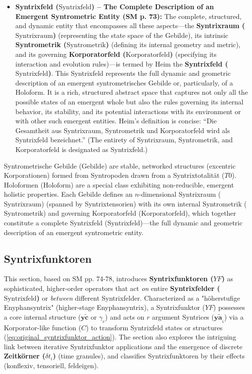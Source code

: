 \documentclass[12pt]{article}
\newcommand{\q}[1]{\enquote{#1}}
\newcommand{\syntrix}{\bm{y\widetilde{a}}}
\newcommand{\syntrixtotalitaet}{T0}
\newcommand{\syntrixfeld}{\text{Syntrixfeld}}
\newcommand{\syntrometrischesGebilde}{\text{Gebilde}}
\newcommand{\holoform}{\text{Holoform}}
\newcommand{\syntrixraum}{\text{Syntrixraum}}
\newcommand{\syntrometrik}{\text{Syntrometrik}}
\newcommand{\korporatorfeld}{\text{Korporatorfeld}}
\newcommand{\syntrixfunktor}{YF}
\newcommand{\zeitkorn}{\delta t_i}
\begin{document}
\begin{itemize}
    \item \textbf{Syntrixfeld (\(\syntrixfeld\)) – The Complete Description of an Emergent Syntrometric Entity (SM p. 73):}
    The complete, structured, and dynamic entity that encompasses all these aspects—the \textbf{Syntrixraum (\(\syntrixraum\))} (representing the state space of the Gebilde), its intrinsic \textbf{Syntrometrik (\(\syntrometrik\))} (defining its internal geometry and metric), and its governing \textbf{Korporatorfeld (\(\korporatorfeld\))} (specifying its interaction and evolution rules)—is termed by Heim the \textbf{Syntrixfeld (\(\syntrixfeld\))}. This Syntrixfeld represents the full dynamic and geometric description of an emergent syntrometrisches Gebilde or, particularly, of a Holoform. It is a rich, structured abstract space that captures not only all the possible states of an emergent whole but also the rules governing its internal behavior, its stability, and its potential interactions with its environment or with other such emergent entities. Heim's definition is concise: \q{Die Gesamtheit aus Syntrixraum, Syntrometrik und Korporatorfeld wird als Syntrixfeld bezeichnet.} (The entirety of Syntrixraum, Syntrometrik, and Korporatorfeld is designated as Syntrixfeld.)
\end{itemize}

Syntrometrische Gebilde (\(\syntrometrischesGebilde\)) are stable, networked structures (excentric Korporationen) formed from Syntropoden drawn from a Syntrixtotalität (\(\syntrixtotalitaet\)). Holoformen (\(\holoform\)) are a special class exhibiting non-reducible, emergent holistic properties. Each Gebilde defines an \(n\)-dimensional Syntrixraum (\(\syntrixraum\)) (spanned by Syntrixtensorien) with its own internal Syntrometrik (\(\syntrometrik\)) and governing Korporatorfeld (\(\korporatorfeld\)), which together constitute a complete Syntrixfeld (\(\syntrixfeld\))—the full dynamic and geometric description of an emergent syntrometric entity.

\subsection{Syntrixfunktoren}
\label{sec:syntrixfunktoren}

This section, based on SM pp. 74-78, introduces \textbf{Syntrixfunktoren (\(\syntrixfunktor\))} as sophisticated, higher-order operators that act \textit{on} entire \textbf{Syntrixfelder (\(\syntrixfeld\))} or \textit{between} different Syntrixfelder. Characterized as a "höherstufige Enyphansyntrix" (higher-stage Enyphansyntrix), a Syntrixfunktor (\(\syntrixfunktor\)) possesses a core internal structure (\(\mathbf{y\widetilde{c}}\) or \(\gamma_c\)) and acts on \(r\) argument Syntrices (\(\syntrix_\varsigma\)) via a Korporator-like function (\(C\)) to transform Syntrixfeld states or structures (\eqref{eq:original_syntrixfunktor_action}). The section also explores the intriguing link between iterative Syntrixfunktor applications and the emergence of discrete \textbf{Zeitkörner (\(\zeitkorn\))} (time granules), and classifies Syntrixfunktoren by their effects (konflexiv, tensoriell, feldeigen).
\end{document}
